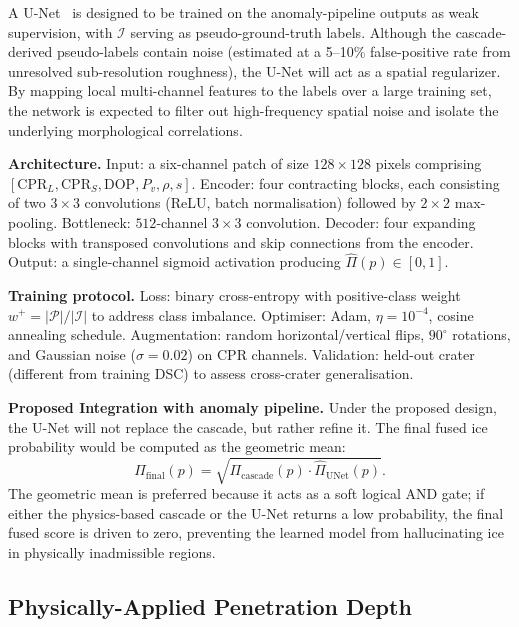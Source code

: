 \documentclass[10pt,conference]{IEEEtran}
\newcommand{\CPR}{\mathrm{CPR}}
\newcommand{\DOP}{\mathrm{DOP}}
\begin{document}
A U-Net~\cite{ronneberger2015unet} is designed to be trained on the anomaly-pipeline outputs as weak supervision, with $\mathcal{I}$ serving as pseudo-ground-truth labels. Although the cascade-derived pseudo-labels contain noise (estimated at a 5--10\% false-positive rate from unresolved sub-resolution roughness), the U-Net will act as a spatial regularizer. By mapping local multi-channel features to the labels over a large training set, the network is expected to filter out high-frequency spatial noise and isolate the underlying morphological correlations.

\textbf{Architecture.}
Input: a six-channel patch of size $128 \times 128$ pixels
comprising $[\CPR_L, \CPR_S, \DOP, P_v, \rho, s]$.
Encoder: four contracting blocks, each consisting of two
$3\times3$ convolutions (ReLU, batch normalisation) followed
by $2\times2$ max-pooling.
Bottleneck: $512$-channel $3\times3$ convolution.
Decoder: four expanding blocks with transposed convolutions and
skip connections from the encoder.
Output: a single-channel sigmoid activation producing
$\hat{\Pi}(p) \in [0,1]$.

\textbf{Training protocol.}
Loss: binary cross-entropy with positive-class weight
$w^+ = |\mathcal{P}| / |\mathcal{I}|$ to address class imbalance.
Optimiser: Adam, $\eta = 10^{-4}$, cosine annealing schedule.
Augmentation: random horizontal/vertical flips, $90^\circ$ rotations,
and Gaussian noise ($\sigma = 0.02$) on CPR channels.
Validation: held-out crater (different from training DSC) to
assess cross-crater generalisation.

\textbf{Proposed Integration with anomaly pipeline.}
Under the proposed design, the U-Net will not replace the cascade, but rather refine it. The final fused ice probability would be computed as the geometric mean:
\begin{equation}
\Pi_{\mathrm{final}}(p) =
  \sqrt{\Pi_{\mathrm{cascade}}(p) \cdot \hat{\Pi}_{\mathrm{UNet}}(p)}.
\label{eq:fusion}
\end{equation}
The geometric mean is preferred because it acts as a soft logical AND gate; if either the physics-based cascade or the U-Net returns a low probability, the final fused score is driven to zero, preventing the learned model from hallucinating ice in physically inadmissible regions.

\subsection{Physically-Applied Penetration Depth}
\label{sec:method:depth}
\end{document}
